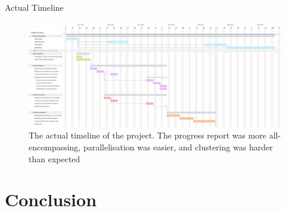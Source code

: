 \documentclass[10pt,aspectratio=169]{beamer}
\begin{document}
\begin{frame}{Actual Timeline}
    \begin{figure}[h]
        \centering
        \includegraphics[width=\textwidth]{images/actual_gantt_chart.png}
        \caption{The actual timeline of the project. The progress report was more all-encompassing, parallelisation was easier, and clustering was harder than expected}
        \label{fig:actual_gantt_chart}
    \end{figure}
\end{frame}



\section{Conclusion}
\end{document}
